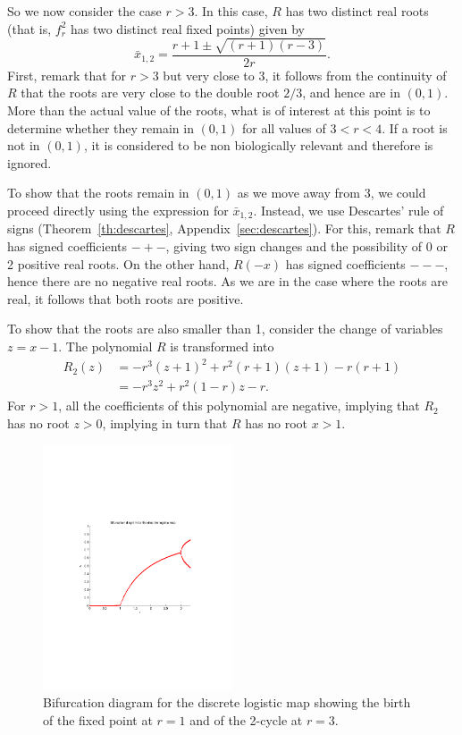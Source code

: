 So we now consider the case $r>3$. In this case, $R$ has two distinct real roots (that is, $f_r^2$ has two distinct real fixed points) given by
\[
\bar x_{1,2}=\frac{r+1\pm\sqrt{(r+1)(r-3)}}{2r}.
\] 
First, remark that for $r>3$ but very close to 3, it follows from the continuity of $R$ that the roots are very close to the double root $2/3$, and hence are in $(0,1)$.
More than the actual value of the roots, what is of interest at this point is to determine whether they remain in $(0,1)$ for all values of $3<r<4$.
If a root is not in $(0,1)$, it is considered to be non biologically relevant and therefore is ignored.

To show that the roots remain in $(0,1)$ as we move away from 3, we could proceed directly using the expression for $\bar x_{1,2}$. Instead, we use Descartes' rule of signs (Theorem~\ref{th:descartes}, Appendix~\ref{sec:descartes}). For this, remark that $R$ has signed coefficients $-+-$, giving two sign changes and the possibility of 0 or 2 positive real roots. On the other hand, $R(-x)$ has signed coefficients $---$, hence there are no negative real roots. As we are in the case where the roots are real, it follows that both roots are positive.

To show that the roots are also smaller than 1, consider the change of variables $z=x-1$. The polynomial $R$ is transformed into 
\begin{align*}
R_2(z) &= -r^3 (z+1)^2+r^2(r+1)(z+1)-r(r+1) \\
&= -r^3z^2+r^2(1-r)z-r.
\end{align*}
For $r>1$, all the coefficients of this polynomial are negative, implying that $R_2$ has no root $z>0$, implying in turn that $R$ has no root $x>1$.
\begin{figure}[htbp]
\begin{center}
\includegraphics[width=0.5\textwidth]
{../figs_02_population_growth/bif_cascade_3}
\caption{Bifurcation diagram for the discrete logistic map showing the birth of the fixed point at $r=1$ and of the 2-cycle at $r=3$.}
\end{center}
\end{figure}


